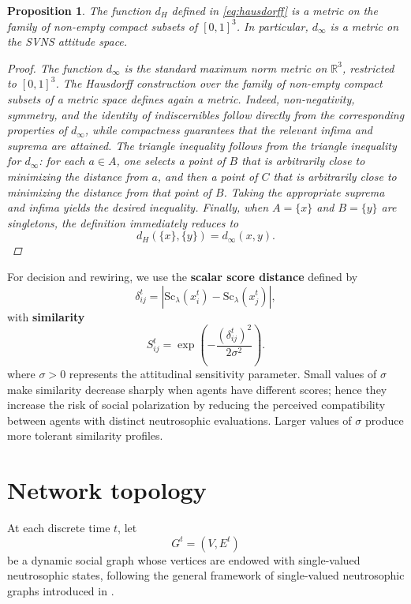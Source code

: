 \documentclass[11pt,a4paper]{article}
\newtheorem{proposition}[theorem]{Proposition}
\newcommand{\score}{\mathrm{Sc}}
\newcommand{\Score}[2][]{\score_{#1}\!\left(#2\right)}
\begin{document}
	\begin{proposition}\label{prop:hausdorff-metric}
		The function $d_H$ defined in \eqref{eq:hausdorff} is a metric on the family of non-empty compact subsets of $[0,1]^3$. In particular, $d_\infty$ is a metric on the SVNS attitude space.
		
		\begin{proof}
			The function $d_\infty$ is the standard maximum norm metric on $\mathbb{R}^3$, restricted to $[0,1]^3$. The Hausdorff construction over the family of non-empty compact subsets of a metric space defines again a metric. Indeed, non-negativity, symmetry, and the identity of indiscernibles follow directly from the corresponding properties of $d_\infty$, while compactness guarantees that the relevant infima and suprema are attained. The triangle inequality follows from the triangle inequality for $d_\infty$: for each $a\in A$, one selects a point of $B$ that is arbitrarily close to minimizing the distance from $a$, and then a point of $C$ that is arbitrarily close to minimizing the distance from that point of $B$. Taking the appropriate suprema and infima yields the desired inequality. Finally, when $A=\{x\}$ and $B=\{y\}$ are singletons, the definition immediately reduces to
			$$
			d_H(\{x\},\{y\})=d_\infty(x,y).
			$$
		\end{proof}  
	\end{proposition}
	
	For decision and rewiring, we use the \textbf{scalar score distance} defined by
	$$
	\delta_{ij}^t = \left| \Score[\lambda]{x_i^t} - \Score[\lambda]{x_j^t}\right|,
	$$
	with \textbf{similarity}
	$$
	S_{ij}^t = \exp\!\left( - \frac{(\delta_{ij}^t)^2}{2\sigma^2} \right).	
	$$
	where $\sigma>0$ represents the attitudinal sensitivity parameter. Small values of $\sigma$ make similarity decrease sharply when agents have diﬀerent scores; hence they increase  the risk of social polarization by reducing the perceived  compatibility between agents with distinct neutrosophic evaluations. Larger values of $\sigma$ produce more tolerant similarity profiles.
	
	\section{Network topology}
	
	At each discrete time $t$, let
	$$
	G^t = (V,E^t)
	$$
	be a dynamic social graph whose vertices are endowed with
	single-valued neutrosophic states, following the general framework of single-valued neutrosophic graphs introduced in
	\cite{broumi2016}.
	
\end{document}
